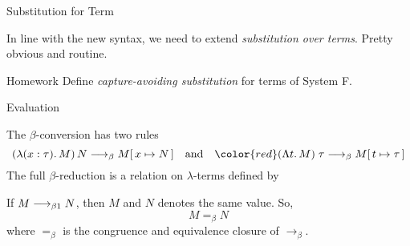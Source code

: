 \begin{frame}{Substitution for Term}
  
In line with the new syntax, we need to extend \emph{substitution over
  terms}. Pretty obvious and routine. 

\begin{block}{Homework}
  Define \emph{capture-avoiding substitution} for terms of System F. 
\end{block}

\end{frame}


\begin{frame}{Evaluation}
  
The $\beta$-conversion has two rules
\[
  (\lambda (x : \tau).\, M)\,N \longrightarrow_{\beta}
  M\subst{x}{N}
  \quad\text{and}\quad
  \color{red} (\Lambda t.\, M)\;\tau \longrightarrow_{\beta} M \subst{t}{\tau}
\]
The full $\beta$-reduction is a relation on $\lambda$-terms defined by
\begin{multicols}{2}
    \begin{prooftree}
    \end{prooftree}
    \begin{prooftree}
    \end{prooftree}
    \begin{prooftree}
    \end{prooftree}
    \begin{prooftree}
    \end{prooftree}
\end{multicols}
If $M \onereduce N$, then $M$ and $N$ \alert{denotes} the same value. So, 
\[
  M =_\beta N
\]
where $=_\beta$ is the congruence and equivalence closure of
$\longrightarrow_\beta$.
\end{frame}

